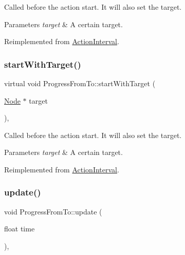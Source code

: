 Called before the action start. It will also set the target.


\begin{DoxyParams}{Parameters}
{\em target} & A certain target. \\
\hline
\end{DoxyParams}


Reimplemented from \hyperlink{classActionInterval_ad3d91186b2c3108488ddbbdbbd982484}{Action\+Interval}.

\mbox{\label{classProgressFromTo_aeab6816a74d30e3ccd407b6c0e160db7}} 
\subsubsection{\texorpdfstring{start\+With\+Target()}{startWithTarget()}\hspace{0.1cm}{\footnotesize\ttfamily [2/2]}}
{\footnotesize\ttfamily virtual void Progress\+From\+To\+::start\+With\+Target (\begin{DoxyParamCaption}\item[{\hyperlink{classNode}{Node} $\ast$}]{target }\end{DoxyParamCaption})\hspace{0.3cm}{\ttfamily [override]}, {\ttfamily [virtual]}}

Called before the action start. It will also set the target.


\begin{DoxyParams}{Parameters}
{\em target} & A certain target. \\
\hline
\end{DoxyParams}


Reimplemented from \hyperlink{classActionInterval_ad3d91186b2c3108488ddbbdbbd982484}{Action\+Interval}.

\mbox{\label{classProgressFromTo_aebb245e96342caf698903ebd33ff9421}} 
\subsubsection{\texorpdfstring{update()}{update()}\hspace{0.1cm}{\footnotesize\ttfamily [1/2]}}
{\footnotesize\ttfamily void Progress\+From\+To\+::update (\begin{DoxyParamCaption}\item[{float}]{time }\end{DoxyParamCaption})\hspace{0.3cm}{\ttfamily [override]}, {\ttfamily [virtual]}}

